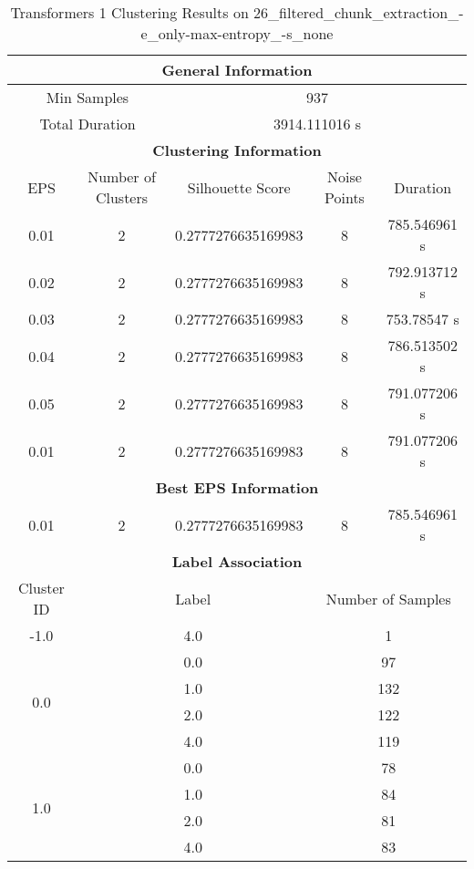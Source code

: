     
    \begin{longtable}{|c|c|c|c|c|}
    \caption{Transformers 1 Clustering Results on 26\_filtered\_chunk\_extraction\_-e\_only-max-entropy\_-s\_none} \label{tab:transformers_1_clustering_results}\\
    \hline
    \multicolumn{5}{|c|}{\textbf{General Information}} \\
    \hline
    \multicolumn{2}{|c|}{Min Samples} & \multicolumn{3}{c|}{937} \\
    \multicolumn{2}{|c|}{Total Duration} & \multicolumn{3}{c|}{3914.111016 s} \\
    \hline
    \multicolumn{5}{|c|}{\textbf{Clustering Information}} \\
    \hline
    EPS & Number of Clusters & Silhouette Score & Noise Points & Duration \\
    0.01 & 2 & 0.2777276635169983 & 8 & 785.546961 s\\
    0.02 & 2 & 0.2777276635169983 & 8 & 792.913712 s\\
    0.03 & 2 & 0.2777276635169983 & 8 & 753.78547 s\\
    0.04 & 2 & 0.2777276635169983 & 8 & 786.513502 s\\
    0.05 & 2 & 0.2777276635169983 & 8 & 791.077206 s\\
    0.01 & 2 & 0.2777276635169983 & 8 & 791.077206 s\\
    \hline
    \multicolumn{5}{|c|}{\textbf{Best EPS Information}} \\
    \hline
    0.01 & 2 & 0.2777276635169983 & 8 & 785.546961 s\\
    \hline
    \multicolumn{5}{|c|}{\textbf{Label Association}} \\
    \hline
    Cluster ID & \multicolumn{2}{c|}{Label} & \multicolumn{2}{c|}{Number of Samples} \\
    \hline
    \multirow{1}{*}{-1.0} & \multicolumn{2}{c|}{4.0} & \multicolumn{2}{c|}{1} \\
    \hline
    \multirow{4}{*}{0.0} & \multicolumn{2}{c|}{0.0} & \multicolumn{2}{c|}{97} \\
    & \multicolumn{2}{c|}{1.0} & \multicolumn{2}{c|}{132} \\
    & \multicolumn{2}{c|}{2.0} & \multicolumn{2}{c|}{122} \\
    & \multicolumn{2}{c|}{4.0} & \multicolumn{2}{c|}{119} \\
    \hline
    \multirow{4}{*}{1.0} & \multicolumn{2}{c|}{0.0} & \multicolumn{2}{c|}{78} \\
    & \multicolumn{2}{c|}{1.0} & \multicolumn{2}{c|}{84} \\
    & \multicolumn{2}{c|}{2.0} & \multicolumn{2}{c|}{81} \\
    & \multicolumn{2}{c|}{4.0} & \multicolumn{2}{c|}{83} \\
    \hline
    \end{longtable}
    
